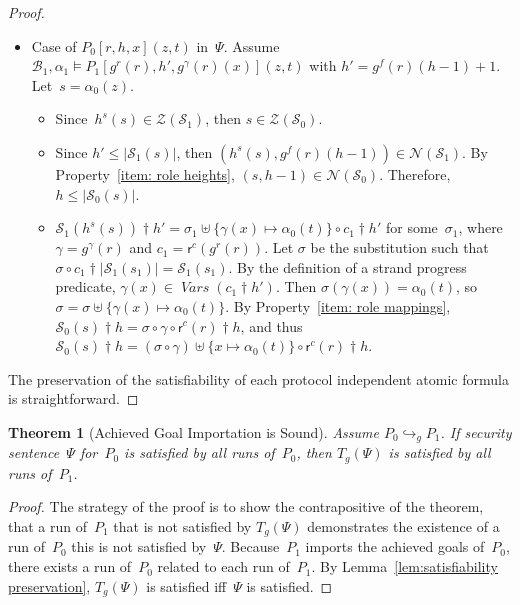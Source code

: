 \documentclass[12pt]{article}
\newtheorem{thm}{Theorem}
\newcommand{\fn}[1]{\ensuremath{\operatorname{\mathit{#1}}}}
\newcommand{\vars}{\fn{Vars}}
\newcommand{\prefix}[2]{#1\dagger#2}
\newcommand{\ssp}{\ensuremath{\mathcal{S}}}
\newcommand{\bun}{\ensuremath{\mathcal{B}}}
\newcommand{\strands}{\ensuremath{\mathcal{Z}}}
\newcommand{\nodes}{\ensuremath{\mathcal{N}}}
\newcommand{\role}{\mathsf{r}}
\begin{document}
\begin{proof}
\begin{itemize}
\item Case of $P_0[r,h,x](z,t)$ in~$\Psi$.  Assume $\bun_1,\alpha_1\models
  P_1[g^r(r),h',g^\gamma(r)(x)](z,t)$ with
  $h'=g^f(r)(h-1)+1$.  Let~$s=\alpha_0(z)$.
  \begin{itemize}
  \item Since~$h^s(s)\in\strands(\ssp_1)$, then
    $s\in\strands(\ssp_0)$.
  \item Since $h'\leq|\ssp_1(s)|$, then
    $(h^s(s),g^f(r)(h-1))\in\nodes(\ssp_1)$. By Property~\ref{item:
    role heights}, $(s,h-1)\in\nodes(\ssp_0)$.  Therefore,
    $h\leq|\ssp_0(s)|$.
  \item
    $\prefix{\ssp_1(h^s(s))}{h'}=
    \sigma_1\uplus\{\gamma(x)\mapsto\alpha_0(t)\}\circ
    \prefix{c_1}{h'}$ for some~$\sigma_1$, where
    $\gamma=g^\gamma(r)$ and $c_1=\role^c(g^r(r))$.  Let $\sigma$ be
    the substitution such that
    $\sigma\circ\prefix{c_1}{|\ssp_1(s_1)|}=\ssp_1(s_1)$.  By the
    definition of a strand progress predicate,
    $\gamma(x)\in\vars(\prefix{c_1}{h'})$.  Then
    $\sigma(\gamma(x))=\alpha_0(t)$, so
    $\sigma=\sigma\uplus\{\gamma(x)\mapsto\alpha_0(t)\}$.  By
    Property~\ref{item: role mappings},
    $\prefix{\ssp_0(s)}{h}=\sigma\circ\gamma\circ\prefix{\role^c(r)}{h}$,
    and thus
    $\prefix{\ssp_0(s)}{h}=(\sigma\circ\gamma)\uplus\{x\mapsto\alpha_0(t)\}\circ
    \prefix{\role^{c}(r)}{h}$.
  \end{itemize}

\end{itemize}

The preservation of the satisfiability of each protocol independent
atomic formula is straightforward.
\end{proof}

\begin{thm}[Achieved Goal Importation is Sound]
Assume $P_0\hookrightarrow_g P_1$.  If security sentence~$\Psi$
for~$P_0$ is satisfied by all runs of~$P_0$, then $T_g(\Psi)$ is
satisfied by all runs of~$P_1$.
\end{thm}

\begin{proof}
The strategy of the proof is to show the contrapositive of the
theorem, that a run of~$P_1$ that is not satisfied by $T_g(\Psi)$
demonstrates the existence of a run of~$P_0$ this is not satisfied
by~$\Psi$.  Because~$P_1$ imports the achieved goals of~$P_0$, there
exists a run of~$P_0$ related to each run of~$P_1$.  By
Lemma~\ref{lem:satisfiability preservation}, $T_g(\Psi)$ is satisfied
iff~$\Psi$ is satisfied.
\end{proof}
\end{document}
